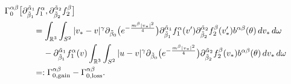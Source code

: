 \documentclass[reqno]{amsart}
\numberwithin{equation}{section}
\numberwithin{equation}{section}
\begin{document}
	\begin{align}
	&\Gamma^{\alpha \beta}_0 \big[\partial_{\tilde{\beta}_1}^{\tilde{\alpha}_1}f^{\alpha}_1, \partial_{\tilde{\beta}_2}^{\tilde{\alpha}_2}f^{\beta}_2\big]\notag\\
		&\hspace{1.2cm}= \int_{\mathbb{R}^3} \int_{S^2} |v_* - v|^\gamma 
		\partial_{\tilde{\beta}_0}  \big(e^{-\frac{m^{\beta}|v_*|^2}{4}}\big) 
		\partial_{\tilde{\beta}_1}^{\tilde{\alpha}_1}f^{\alpha}_1 (v') \partial_{\tilde{\beta}_2}^{\tilde{\alpha}_2}f^{\beta}_2 (v_*') 
		b^{\alpha\beta}(\theta) \, dv_* \, d\omega\notag\\
		&\hspace{1.6cm}- \partial_{\tilde{\beta}_1}^{\tilde{\alpha}_1}f^{\alpha}_1(v) 
		\int_{\mathbb{R}^3} \int_{S^2} |u - v|^\gamma 
		\partial_{\tilde{\beta}_0}  \big(e^{-\frac{m^{\beta}|v_*|^2}{4}}\big) 
		\partial_{\tilde{\beta}_2}^{\tilde{\alpha}_2}f^{\beta}_2 (v_*)
		b^{\alpha\beta}(\theta) \, dv_* \, d\omega \notag\\
		&\hspace{1.2cm}=: \Gamma_{0,\text{gain}}^{\alpha \beta} - \Gamma_{0,\text{loss}}^{\alpha \beta}. \label{Dsocald57}
	\end{align}
	
	
	
	
	
\end{document}
